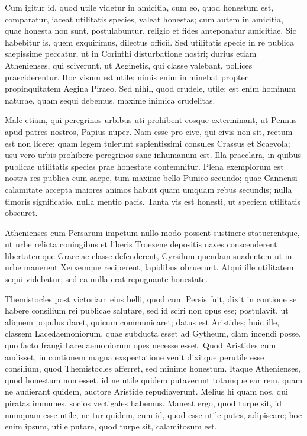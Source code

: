  Cum igitur id, quod utile videtur in amicitia, cum eo, quod honestum est, comparatur, iaceat utilitatis species, valeat honestas; cum autem in amicitia, quae honesta non sunt, postulabuntur, religio et fides anteponatur amicitiae. Sic habebitur is, quem exquirimus, dilectus officii. Sed utilitatis specie in re publica saepissime peccatur, ut in Corinthi disturbatione nostri; durius etiam Athenienses, qui sciverunt, ut Aeginetis, qui classe valebant, pollices praeciderentur. Hoc visum est utile; nimis enim imminebat propter propinquitatem Aegina Piraeo. Sed nihil, quod crudele, utile; est enim hominum naturae, quam sequi debemus, maxime inimica crudelitas.

 Male etiam, qui peregrinos urbibus uti prohibent eosque exterminant, ut Pennus apud patres nostros, Papius nuper. Nam esse pro cive, qui civis non sit, rectum est non licere; quam legem tulerunt sapientissimi consules Crassus et Scaevola; usu vero urbis prohibere peregrinos sane inhumanum est. Illa praeclara, in quibus publicae utilitatis species prae honestate contemnitur. Plena exemplorum est nostra res publica cum saepe, tum maxime bello Punico secundo; quae Cannensi calamitate accepta maiores animos habuit quam umquam rebus secundis; nulla timoris significatio, nulla mentio pacis. Tanta vis est honesti, ut speciem utilitatis obscuret.

 Athenienses cum Persarum impetum nullo modo possent sustinere statuerentque, ut urbe relicta coniugibus et liberis Troezene depositis naves conscenderent libertatemque Graeciae classe defenderent, Cyrsilum quendam suadentem ut in urbe manerent Xerxemque reciperent, lapidibus obruerunt. Atqui ille utilitatem sequi videbatur; sed ea nulla erat repugnante honestate.

 Themistocles post victoriam eius belli, quod cum Persis fuit, dixit in contione se habere consilium rei publicae salutare, sed id sciri non opus ese; postulavit, ut aliquem populus daret, quicum communicaret; datus est Aristides; huic ille, classem Lacedaemoniorum, quae subducta esset ad Gytheum, clam incendi posse, quo facto frangi Lacedaemoniorum opes necesse esset. Quod Aristides cum audisset, in contionem magna exspectatione venit dixitque perutile esse consilium, quod Themistocles afferret, sed minime honestum. Itaque Athenienses, quod honestum non esset, id ne utile quidem putaverunt totamque ear rem, quam ne audierant quidem, auctore Aristide repudiaverunt. Melius hi quam nos, qui piratas immunes, socios vectigales habemus. Maneat ergo, quod turpe sit, id numquam esse utile, ne tur quidem, cum id, quod esse utile putes, adipiscare; hoc enim ipsum, utile putare, quod turpe sit, calamitosum est.

